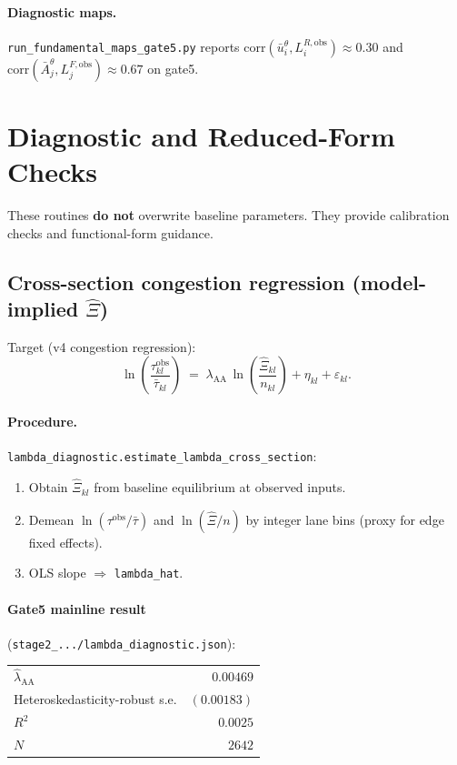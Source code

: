 \documentclass[11pt]{article}
\newcommand{\ubar}{\bar u}
\newcommand{\Abar}{\bar A}
\newcommand{\obs}{\mathrm{obs}}
\newcommand{\AAcal}{\mathrm{AA}}
\begin{document}
\paragraph{Diagnostic maps.}
\texttt{run\_fundamental\_maps\_gate5.py} reports
$\mathrm{corr}(\ubar_i^{\theta},L_i^{R,\obs})\approx 0.30$ and
$\mathrm{corr}(\Abar_j^{\theta},L_j^{F,\obs})\approx 0.67$ on gate5.

\section{Diagnostic and Reduced-Form Checks}\label{sec:diagnostic}

These routines \textbf{do not} overwrite baseline parameters.  They
provide calibration checks and functional-form guidance.

\subsection{Cross-section congestion regression (model-implied $\hat\Xi$)}

Target (v4 congestion regression):
\begin{equation}\label{eq:lambda_regression}
  \ln\!\left(\frac{\tau^{\obs}_{kl}}{\bar\tau_{kl}}\right)
  \;=\;
  \lambda_{\AAcal}\,
  \ln\!\left(\frac{\hat\Xi_{kl}}{n_{kl}}\right)
  + \eta_{kl} + \varepsilon_{kl}.
\end{equation}

\paragraph{Procedure.}
\texttt{lambda\_diagnostic.estimate\_lambda\_cross\_section}:
\begin{enumerate}[leftmargin=2em]
  \item Obtain $\hat\Xi_{kl}$ from baseline equilibrium at observed
        inputs.
  \item Demean $\ln(\tau^{\obs}/\bar\tau)$ and $\ln(\hat\Xi/n)$ by
        integer lane bins (proxy for edge fixed effects).
  \item OLS slope $\Rightarrow$ \texttt{lambda\_hat}.
\end{enumerate}

\paragraph{Gate5 mainline result}
(\texttt{stage2\_.../lambda\_diagnostic.json}):
\begin{center}
\begin{tabular}{@{}lr@{}}
\toprule
$\hat\lambda_{\AAcal}$ & $0.00469$ \\
Heteroskedasticity-robust s.e. & $(0.00183)$ \\
$R^2$ & $0.0025$ \\
$N$ & $2642$ \\
\bottomrule
\end{tabular}
\end{center}
\end{document}
